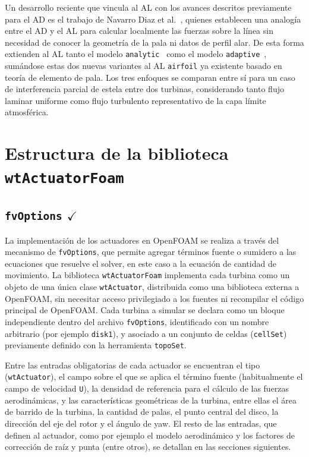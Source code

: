 Un desarrollo reciente que vincula al AL con los avances descritos previamente para el AD es el trabajo de Navarro Diaz et al.~\cite{navarrodiaz2023}, quienes establecen una analogía entre el AD y el AL para calcular localmente las fuerzas sobre la línea sin necesidad de conocer la geometría de la pala ni datos de perfil alar. De esta forma extienden al AL tanto el modelo \texttt{analytic}~\cite{sorensen2020} como el modelo \texttt{adaptive}~\cite{navarrodiaz2019}, sumándose estas dos nuevas variantes al AL \texttt{airfoil} ya existente basado en teoría de elemento de pala. Los tres enfoques se comparan entre sí para un caso de interferencia parcial de estela entre dos turbinas, considerando tanto flujo laminar uniforme como flujo turbulento representativo de la capa límite atmosférica.

\clearpage



\section{Estructura de la biblioteca \texttt{wtActuatorFoam}}

\subsection{\texttt{fvOptions} $\checkmark$}

La implementación de los actuadores en OpenFOAM se realiza a través del mecanismo de \texttt{fvOptions}, que permite agregar términos fuente o sumidero a las ecuaciones que resuelve el solver, en este caso a la ecuación de cantidad de movimiento. La biblioteca \texttt{wtActuatorFoam} implementa cada turbina como un objeto de una única clase \texttt{wtActuator}, distribuida como una biblioteca externa a OpenFOAM, sin necesitar acceso privilegiado a los fuentes ni recompilar el código principal de OpenFOAM. Cada turbina a simular se declara como un bloque independiente dentro del archivo \texttt{fvOptions}, identificado con un nombre arbitrario (por ejemplo \texttt{disk1}), y asociado a un conjunto de celdas (\texttt{cellSet}) previamente definido con la herramienta \texttt{topoSet}.

Entre las entradas obligatorias de cada actuador se encuentran el tipo (\texttt{wtActuator}), el campo sobre el que se aplica el término fuente (habitualmente el campo de velocidad \texttt{U}), la densidad de referencia para el cálculo de las fuerzas aerodinámicas, y las características geométricas de la turbina, entre ellas el área de barrido de la turbina, la cantidad de palas, el punto central del disco, la dirección del eje del rotor y el ángulo de yaw. El resto de las entradas, que definen al actuador, como por ejemplo el modelo aerodinámico y los factores de corrección de raíz y punta (entre otros), se detallan en las secciones siguientes.

